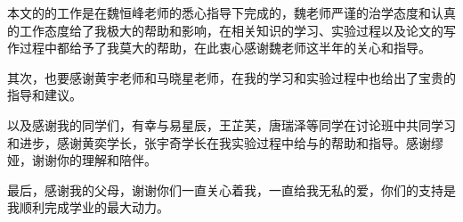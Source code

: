\begin{acknowledgement}
\par 本文的的工作是在魏恒峰老师的悉心指导下完成的，魏老师严谨的治学态度和认真的工作态度给了我极大的帮助和影响，在相关知识的学习、实验过程以及论文的写作过程中都给予了我莫大的帮助，在此衷心感谢魏老师这半年的关心和指导。
\par 其次，也要感谢黄宇老师和马晓星老师，在我的学习和实验过程中也给出了宝贵的指导和建议。
\par 以及感谢我的同学们，有幸与易星辰，王芷芙，唐瑞泽等同学在讨论班中共同学习和进步，感谢黄奕学长，张宇奇学长在我实验过程中给与的帮助和指导。感谢缪娅，谢谢你的理解和陪伴。
\par 最后，感谢我的父母，谢谢你们一直关心着我，一直给我无私的爱，你们的支持是我顺利完成学业的最大动力。
\end{acknowledgement}